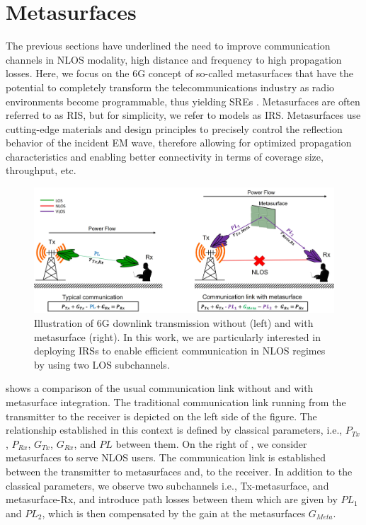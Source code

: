 \section{Metasurfaces} \label{Metasurfaces} 
The previous sections have underlined the need to improve communication channels in NLOS modality, high distance and frequency to high propagation losses. Here, we focus on the 6G concept of so-called metasurfaces that have the potential to completely transform the telecommunications industry as radio environments become programmable, thus yielding \ac{SRE}s \cite{8796365}. Metasurfaces are often referred to as \ac{RIS}, but for simplicity, we refer to models as \ac{IRS}. Metasurfaces use cutting-edge materials and design principles to precisely control the reflection behavior of the incident EM wave, therefore allowing for optimized propagation characteristics and enabling better connectivity in terms of coverage size, throughput, etc. 
\begin{figure}[H]
	\centering
	\includegraphics[width=0.9\linewidth]{images/Section 2 Images/Comm_link}
	\caption{Illustration of 6G downlink transmission without (left) and with metasurface (right). In this work, we are particularly interested in deploying IRSs to enable efficient communication in  NLOS regimes by using two LOS subchannels.}
	\label{fig:commlink}
\end{figure}
 shows a comparison of the usual communication link without and with metasurface integration. The traditional communication link running from the transmitter to the receiver is depicted on the left side of the figure. The relationship established in this context is defined by classical parameters, i.e., $P_{Tx}$, $P_{Rx}$, $G_{Tx}$, $G_{Rx}$, and $PL$ between them. On the right of , we consider metasurfaces to serve NLOS users. The communication link is established between the transmitter to metasurfaces and, to the receiver. In addition to the classical parameters, we observe two subchannels i.e., Tx-metasurface, and metasurface-Rx, and introduce path losses between them which are given by $PL_{1}$ and $PL_{2}$, which is then compensated by the gain at the metasurfaces $G_{Meta}$.

